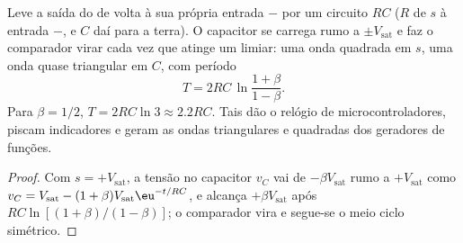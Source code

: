 \begin{proposition}\label{prop:b2:feedback-oscillators:astable}
Leve a saída do  de volta à sua própria entrada $-$
por um circuito $RC$ ($R$ de $s$ à entrada $-$, e $C$ daí
para a terra). O capacitor se carrega rumo a $\pm V_{\text{sat}}$ e faz o
comparador virar cada vez que atinge um limiar: uma onda quadrada em $s$, uma
onda quase triangular em $C$, com período
\[
T = 2RC\,\ln\frac{1 + \beta}{1 - \beta} .
\]
Para $\beta = 1/2$, $T = 2RC\ln3 \approx 2.2RC$. Tais \emph{} dão o relógio de microcontroladores, piscam indicadores e geram
as ondas triangulares e quadradas dos geradores de funções.
\end{proposition}

\begin{proof}
Com $s = +V_{\text{sat}}$, a tensão no capacitor $v_C$ vai de
$-\beta V_{\text{sat}}$ rumo a $+V_{\text{sat}}$ como $v_C = V_{\text{sat}} - (1 + \beta)
V_{\text{sat}}\eu^{-t/RC}$, e alcança $+\beta V_{\text{sat}}$ após $RC\ln[(1 + \beta)
/(1 - \beta)]$; o comparador vira e segue-se o meio ciclo simétrico.
\end{proof}

